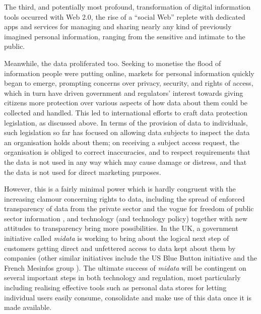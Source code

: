\documentclass[runningheads,a4paper]{llncs}
\begin{document}


The third, and potentially most profound, transformation of digital information tools occurred with Web 2.0, the rise of a ``social Web'' replete with dedicated apps and services for managing and sharing nearly any kind of previously imagined personal information, ranging from the sensitive and intimate to the public.  

Meanwhile, the data proliferated too. Seeking to monetise the flood of information people were putting online, markets for personal information quickly began to emerge, prompting concerns over privacy, security, and rights of access, which in turn have driven government and regulators’ interest towards giving citizens more protection over various aspects of how data about them could be collected and handled.  This led to international efforts to craft data protection legislation, as discussed above.  In terms of the provision of data to individuals, such legislation so far has focused on allowing data subjects to inspect the data an organisation holds about them; on receiving a subject access request, the organisation is obliged to correct inaccuracies, and to respect requirements that the data is not used in any way which may cause damage or distress, and that the data is not used for direct marketing purposes.

However, this is a fairly minimal power which is hardly congruent with the increasing clamour concerning rights to data, including the spread of enforced transparency of data from the private sector \cite{} and the vogue for freedom of public sector information \cite{}, and technology (and technology policy) together with new attitudes to transparency bring more possibilities. In the UK, a government initiative called \emph{midata} \cite{midata} is working to bring about the logical next step of customers getting direct and unfettered access to data kept about them by companies (other similar initiatives include the US Blue Button initiative \cite{} and the French Mesinfos group \cite{}).  The ultimate success of \emph{midata} will be contingent on several important steps in both technology and regulation, most particularly including realising effective tools such as personal data stores for letting individual users easily consume, consolidate and make use of this data once it is made available.
\end{document}
